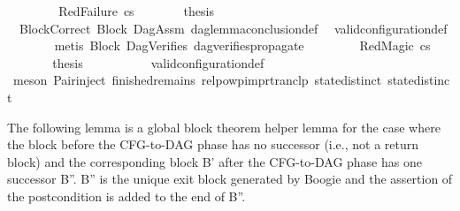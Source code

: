 \begin{isabellebody}
\ \ \isamarkupfalse%
\isanewline
\ \ \ \ \isamarkupfalse%
\ {\isacharparenleft}{\kern0pt}RedFailure\ cs{\isacharparenright}{\kern0pt}\isanewline
\ \ \ \ \isamarkupfalse%
\ \isamarkupfalse%
\ {\isacharquery}{\kern0pt}thesis\ \ \ \isanewline
\ \ \ \ \ \ \isamarkupfalse%
\ \ BlockCorrect\ Block\ DagAssm\ dag{\isacharunderscore}{\kern0pt}lemma{\isacharunderscore}{\kern0pt}conclusion{\isacharunderscore}{\kern0pt}def\ \isamarkupfalse%
\ valid{\isacharunderscore}{\kern0pt}configuration{\isacharunderscore}{\kern0pt}def\isanewline
\ \ \ \ \ \ \isamarkupfalse%
\ {\isacharparenleft}{\kern0pt}metis\ Block{}\ DagVerifies\ dag{\isacharunderscore}{\kern0pt}verifies{\isacharunderscore}{\kern0pt}propagate{\isacharunderscore}{\kern0pt}{}{\isacharparenright}{\kern0pt}\isanewline
\ \ \isamarkupfalse%
\isanewline
\ \ \ \ \isamarkupfalse%
\ {\isacharparenleft}{\kern0pt}RedMagic\ cs{\isacharparenright}{\kern0pt}\isanewline
\ \ \ \ \isamarkupfalse%
\ \isamarkupfalse%
\ {\isacharquery}{\kern0pt}thesis\isanewline
\ \ \ \ \ \ \isamarkupfalse%
\ {}\ \isamarkupfalse%
\ valid{\isacharunderscore}{\kern0pt}configuration{\isacharunderscore}{\kern0pt}def\isanewline
\ \ \ \ \ \ \isamarkupfalse%
\ {\isacharparenleft}{\kern0pt}meson\ Pair{\isacharunderscore}{\kern0pt}inject\ finished{\isacharunderscore}{\kern0pt}remains\ relpowp{\isacharunderscore}{\kern0pt}imp{\isacharunderscore}{\kern0pt}rtranclp\ state{\isachardot}{\kern0pt}distinct{\isacharparenleft}{\kern0pt}{}{\isacharparenright}{\kern0pt}\ state{\isachardot}{\kern0pt}distinct{\isacharparenleft}{\kern0pt}{}{\isacharparenright}{\kern0pt}{\isacharparenright}{\kern0pt}\ \ \ \ \ \isanewline
\ \ \isamarkupfalse%
\isanewline
{}\isamarkupfalse%
%
\endisatagproof
{\isafoldproof}%
%
\isadelimproof
%
\endisadelimproof
%
\begin{isamarkuptext}%
The following lemma is a global block theorem helper lemma for the case where the block
before the CFG-to-DAG phase has no successor (i.e., not a return block) and 
the corresponding block B' after the CFG-to-DAG phase has one successor B''. B'' is the unique exit block
generated by Boogie and the assertion of the postcondition is added to the end of B''.%
\end{isamarkuptext}\isamarkuptrue%

\end{isabellebody}
